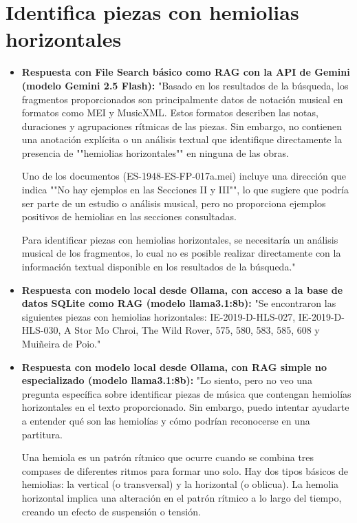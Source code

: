 \section{Identifica piezas con hemiolias horizontales}
\begin{itemize}
    \item \textbf{Respuesta con File Search básico como RAG con la API de Gemini (modelo Gemini 2.5 Flash):} "Basado en los resultados de la búsqueda, los fragmentos proporcionados son principalmente datos de notación musical en formatos como MEI y MusicXML. Estos formatos describen las notas, duraciones y agrupaciones rítmicas de las piezas. Sin embargo, no contienen una anotación explícita o un análisis textual que identifique directamente la presencia de ""hemiolias horizontales"" en ninguna de las obras.

Uno de los documentos (ES-1948-ES-FP-017a.mei) incluye una dirección que indica ""No hay ejemplos en las Secciones II y III"", lo que sugiere que podría ser parte de un estudio o análisis musical, pero no proporciona ejemplos positivos de hemiolias en las secciones consultadas.

Para identificar piezas con hemiolias horizontales, se necesitaría un análisis musical de los fragmentos, lo cual no es posible realizar directamente con la información textual disponible en los resultados de la búsqueda."
    \item \textbf{Respuesta con modelo local desde Ollama, con acceso a la base de datos SQLite como RAG (modelo llama3.1:8b):} "Se encontraron las siguientes piezas con hemiolias horizontales: IE-2019-D-HLS-027, IE-2019-D-HLS-030, A Stor Mo Chroi, The Wild Rover, 575, 580, 583, 585, 608 y Muiñeira de Poio."
    \item \textbf{Respuesta con modelo local desde Ollama, con RAG simple no especializado (modelo llama3.1:8b):} "Lo siento, pero no veo una pregunta específica sobre identificar piezas de música que contengan hemiolías horizontales en el texto proporcionado. Sin embargo, puedo intentar ayudarte a entender qué son las hemiolías y cómo podrían reconocerse en una partitura.

Una hemiola es un patrón rítmico que ocurre cuando se combina tres compases de diferentes ritmos para formar uno solo. Hay dos tipos básicos de hemiolias: la vertical (o transversal) y la horizontal (o oblicua). La hemolia horizontal implica una alteración en el patrón rítmico a lo largo del tiempo, creando un efecto de suspensión o tensión.


\end{itemize}
